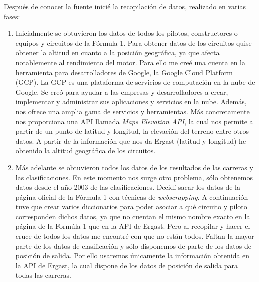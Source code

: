 Después de conocer la fuente inicié la recopilación de datos, realizado en varias fases:
\begin{enumerate}
    \item Inicialmente se obtuvieron los datos de todos los pilotos, constructores o equipos y circuitos de la Fórmula 1. Para obtener datos de los circuitos quise obtener la altitud en cuanto a la posición geográfica, ya que afecta notablemente al rendimiento del motor. Para ello me creé una cuenta en la herramienta para desarrolladores de Google, la Google Cloud Platform (GCP). La GCP es una plataforma de servicios de computación en la nube de Google. Se creó para ayudar a las empresas y desarrolladores a crear, implementar y administrar sus aplicaciones y servicios en la nube. Además, nos ofrece una amplia gama de servicios y herramientas. Más concretamente nos proporciona una API llamada \textit{Maps Elevation API}, la cual nos permite a partir de un punto de latitud y longitud, la elevación del terreno entre otros datos. A partir de la información que nos da Ergast (latitud y longitud) he obtenido la altitud geográfica de los circuitos.
 
    \item Más adelante se obtuvieron todos los datos de los resultados de las carreras y las clasificaciones. En este momento nos surge otro problema, sólo obtenemos datos desde el año 2003 de las clasificaciones. Decidí sacar los datos de la página oficial de la Fórmula 1 con técnicas de \textit{webscrapping}. A continuación tuve que crear varios diccionarios para poder asociar a qué circuito y piloto corresponden dichos datos, ya que no cuentan el mismo nombre exacto en la página de la Formúla 1 que en la API de Ergast. Pero al recopilar y hacer el cruce de todos los datos me encontré con que no están todos. Faltan la mayor parte de los datos de clasificación y sólo disponemos de parte de los datos de posición de salida. Por ello usaremos únicamente la información obtenida en la API de Ergast, la cual dispone de los datos de posición de salida para todas las carreras.


\end{enumerate}
